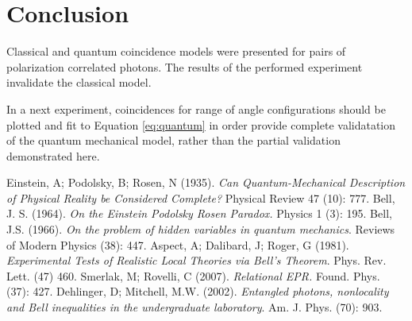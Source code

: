 \documentclass{article}
\begin{document}
\section{Conclusion}

Classical and quantum coincidence models were presented for pairs of polarization correlated photons. The results of the performed experiment invalidate the classical model.

In a next experiment, coincidences for range of angle configurations should be plotted and fit to Equation \ref{eq:quantum} in order provide complete validatation of the quantum mechanical model, rather than the partial validation demonstrated here.

\begin{thebibliography}{9}
    Einstein, A; Podolsky, B; Rosen, N (1935). 
    \emph{Can Quantum-Mechanical Description of Physical Reality be Considered Complete?}
    Physical Review 47 (10): 777.
    Bell, J. S. (1964). 
    \emph{On the Einstein Podolsky Rosen Paradox.} 
    Physics 1 (3): 195.
    Bell, J.S. (1966). 
    \emph{On the problem of hidden variables in quantum mechanics}. 
    Reviews of Modern Physics (38): 447.
    Aspect, A; Dalibard, J; Roger, G (1981).
    \emph{Experimental Tests of Realistic Local Theories via Bell's Theorem}.
    Phys. Rev. Lett. (47) 460.
    Smerlak, M; Rovelli, C (2007).
    \emph{Relational EPR.}
    Found. Phys. (37): 427.
    Dehlinger, D; Mitchell, M.W. (2002).
    \emph{Entangled photons, nonlocality and Bell inequalities in the undergraduate laboratory}.
    Am. J. Phys. (70): 903.

\end{thebibliography}
\end{document}
